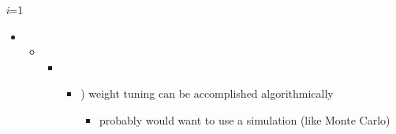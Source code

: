 \documentclass[12pt,twoside]{article}
\begin{document}
\begin{FlushLeft}
{\fontsize{7pt}{8.4pt}\selectfont \textit{i}=1\par}
\end{FlushLeft}\par


\vspace{\baselineskip}
\begin{itemize}
	\item \begin{itemize}
	\item \begin{itemize}
	\item \begin{itemize}
	\item {\fontsize{10pt}{12.0pt}) weight tuning can be accomplished algorithmically\par}\par

\begin{itemize}
	\item {\fontsize{10pt}{12.0pt}\selectfont probably would want to use a simulation (like Monte Carlo)\par}\par


\vspace{\baselineskip}

\end{itemize}
\end{itemize}
\end{itemize}
\end{itemize}
\end{itemize}
\vspace{\baselineskip}
\end{document}
